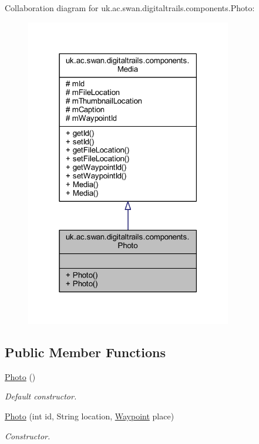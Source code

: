 Collaboration diagram for uk.\+ac.\+swan.\+digitaltrails.\+components.\+Photo\+:
\nopagebreak
\begin{figure}[H]
\begin{center}
\leavevmode
\includegraphics[width=255pt]{classuk_1_1ac_1_1swan_1_1digitaltrails_1_1components_1_1_photo__coll__graph}
\end{center}
\end{figure}
\subsection*{Public Member Functions}
\begin{DoxyCompactItemize}
\item 
\hyperlink{classuk_1_1ac_1_1swan_1_1digitaltrails_1_1components_1_1_photo_adc5c3ad0f4e653d0a6762352e23dd361}{Photo} ()
\begin{DoxyCompactList}\small\item\em Default constructor. \end{DoxyCompactList}\item 
\hyperlink{classuk_1_1ac_1_1swan_1_1digitaltrails_1_1components_1_1_photo_af3fb0fc6b1ff7e701d3fba836bca588e}{Photo} (int id, String location, \hyperlink{classuk_1_1ac_1_1swan_1_1digitaltrails_1_1components_1_1_waypoint}{Waypoint} place)
\begin{DoxyCompactList}\small\item\em Constructor. \end{DoxyCompactList}\end{DoxyCompactItemize}
